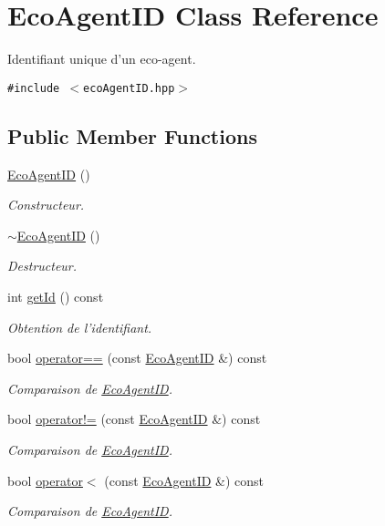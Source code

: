 \hypertarget{classEcoAgentID}{
\section{EcoAgentID Class Reference}
\label{classEcoAgentID}
}
Identifiant unique d'un eco-agent.  


{\tt \#include $<$ecoAgentID.hpp$>$}

\subsection*{Public Member Functions}
\begin{CompactItemize}
\item 
\hyperlink{classEcoAgentID_9c337e2ad56912db99193c03d1f82c56}{EcoAgentID} ()
\begin{CompactList}\small\item\em Constructeur. \item\end{CompactList}\item 
\hyperlink{classEcoAgentID_97da1c0ae8891bbf10feb0574ef64a26}{$\sim$EcoAgentID} ()
\begin{CompactList}\small\item\em Destructeur. \item\end{CompactList}\item 
int \hyperlink{classEcoAgentID_30abc8a92bd07523b8e4f4baf312b56e}{getId} () const 
\begin{CompactList}\small\item\em Obtention de l'identifiant. \item\end{CompactList}\item 
bool \hyperlink{classEcoAgentID_a6c183361e0ccdab9da2c6666d77c111}{operator==} (const \hyperlink{classEcoAgentID}{EcoAgentID} \&) const 
\begin{CompactList}\small\item\em Comparaison de \hyperlink{classEcoAgentID}{EcoAgentID}. \item\end{CompactList}\item 
bool \hyperlink{classEcoAgentID_8ffde7f02500120884ef35ade65b3e6e}{operator!=} (const \hyperlink{classEcoAgentID}{EcoAgentID} \&) const 
\begin{CompactList}\small\item\em Comparaison de \hyperlink{classEcoAgentID}{EcoAgentID}. \item\end{CompactList}\item 
bool \hyperlink{classEcoAgentID_24d44b31302cd2761ffce1df8f74f12c}{operator$<$} (const \hyperlink{classEcoAgentID}{EcoAgentID} \&) const 
\begin{CompactList}\small\item\em Comparaison de \hyperlink{classEcoAgentID}{EcoAgentID}. \item\end{CompactList}\end{CompactItemize}

